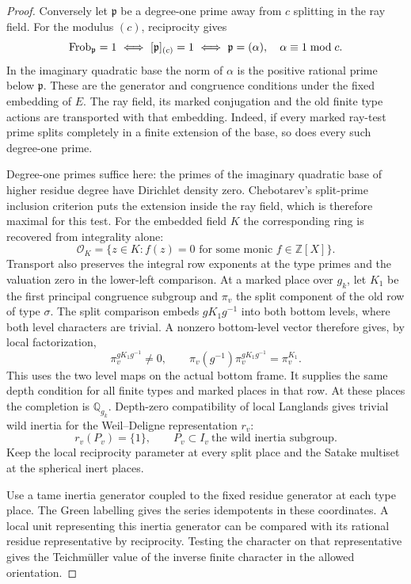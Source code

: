 \begin{proof}
Conversely let \(\mathfrak p\) be a degree-one prime away from \(c\)
splitting in the ray field. For the modulus \((c)\), reciprocity gives
\[
 {\rm Frob}_{\mathfrak p}=1
 \ \Longleftrightarrow\ [\mathfrak p]_{(c)}=1
 \ \Longleftrightarrow\
 \mathfrak p=(\alpha),\quad \alpha\equiv1\bmod c.
\]
In the imaginary quadratic base the norm of \(\alpha\) is the
positive rational prime below \(\mathfrak p\). These are the
generator and congruence conditions under the fixed embedding of \(E\). The ray
field, its marked conjugation and the old finite type actions are
transported with that embedding. \label{cor:automorphic-realization-16}
Indeed, if every marked ray-test prime splits completely in a finite
extension of the base, so does every such degree-one prime.

Degree-one primes suffice here: the primes of the imaginary quadratic
base of higher residue degree have Dirichlet density zero. Chebotarev's
split-prime inclusion criterion puts the extension inside the ray
field, which is therefore maximal for this test. For the embedded field \(K\) the corresponding ring is recovered from integrality alone:
\[
 \mathcal O_K=\{z\in K:f(z)=0\text{ for some monic } f\in\mathbb Z[X]\}.
\] Transport also preserves the integral row
exponents at the type primes and the valuation zero in the
lower-left comparison. \label{cor:automorphic-realization-17}
At a marked place over \(g_k\), let \(K_1\) be the first
principal congruence subgroup and \(\pi_v\) the split component
of the old row of type \(\sigma\). The split comparison embeds
\(gK_1g^{-1}\) into both bottom levels, where both level
characters are trivial. A nonzero bottom-level vector therefore
gives, by local factorization,
\[
 \pi_v^{gK_1g^{-1}}\ne0,\qquad
       \pi_v(g^{-1})\pi_v^{gK_1g^{-1}}=\pi_v^{K_1}.
\]
This uses the two level maps on the actual bottom frame.
It supplies the same depth condition for all finite types and
marked places in that row. At these places the completion
is \(\mathbb Q_{g_k}\). Depth-zero compatibility of local Langlands gives trivial wild inertia for the Weil--Deligne representation \(r_v\):
\[
 r_v(P_v)=\{1\},\qquad P_v\subset I_v\ \text{the wild inertia subgroup}.
\] Keep the local reciprocity parameter
at every split place and the Satake multiset at the spherical
inert places. \label{cor:automorphic-realization-18}

Use a tame inertia generator coupled to the fixed residue
generator at each type place. The Green labelling gives the
series idempotents in these coordinates. A local unit
representing this inertia generator can be compared with
its rational residue representative by reciprocity. Testing
the character on that representative gives the Teichm\"uller value
of the inverse finite character in the allowed orientation.


\end{proof}
